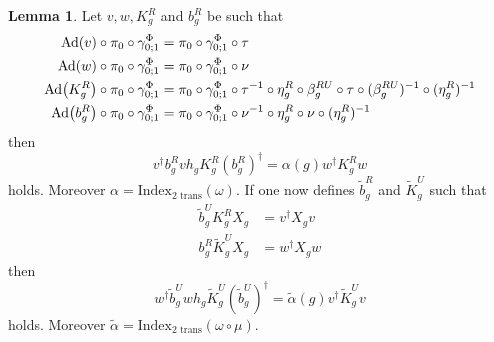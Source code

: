 \documentclass[12pt,a4paper,twoside]{article}
\let\originalleft\left
\let\originalright\right
\renewcommand{\left}{\mathopen{}\mathclose\bgroup\originalleft}
\renewcommand{\right}{\aftergroup\egroup\originalright}
\newcommand{\Ad}[1]{\textrm{Ad}\left(#1\right)}
\theoremstyle{definition}
\newtheorem{lemma}[theorem]{Lemma}
\numberwithin{equation}{section}
\begin{document}
\begin{lemma}
	Let $v,w,K_g^R$ and $b_g^R$ be such that
	\begin{align}
		\Ad{v}\circ\pi_0\circ\gamma^\Phi_{0;1}&=\pi_0\circ\gamma^\Phi_{0;1}\circ\tau\\
		\Ad{w}\circ\pi_0\circ\gamma^\Phi_{0;1}&=\pi_0\circ\gamma^\Phi_{0;1}\circ\nu\\
		\Ad{K_g^R}\circ\pi_0\circ\gamma^\Phi_{0;1}&=\pi_0\circ\gamma^\Phi_{0;1}\circ\tau^{-1}\circ\eta_g^R\circ\beta_g^{RU}\circ\tau\circ(\beta_g^{RU})^{-1}\circ(\eta_g^R)^{-1}\\
		\Ad{b_g^R}\circ\pi_0\circ\gamma^\Phi_{0;1}&=\pi_0\circ\gamma^\Phi_{0;1}\circ\nu^{-1}\circ\eta_g^R\circ\nu\circ(\eta_g^R)^{-1}
	\end{align}
	then
	\begin{equation}\label{eq:H^1IndexRotationInvariantHorizontalIndex}
		v^\dagger b_g^R vh_g K_g^R (b_g^R)^\dagger=\alpha(g)w^\dagger K_g^R w
	\end{equation}
	holds. Moreover $\alpha=\textrm{Index}_{\text{2 trans}}(\omega)$. If one now defines $\tilde{b}_g^R$ and $\tilde{K}_g^U$ such that
	\begin{align}
		\label{eq:H^1IndexRotationInvariantFirstDefinition}
		\tilde{b}_g^UK_g^R X_g&=v^\dagger X_g v\\
		\label{eq:H^1IndexRotationInvariantSecondDefinition}
		b_g^R\tilde{K}_g^UX_g&=w^\dagger X_g w
	\end{align}
	then
	\begin{equation}\label{eq:H^1IndexRotationInvariantVerticalIndex}
		w^\dagger \tilde b_g^U wh_g \tilde K_g^U (\tilde b_g^U)^\dagger=\tilde\alpha(g)v^\dagger \tilde K_g^U v
	\end{equation}
	holds. Moreover $\tilde\alpha=\textrm{Index}_{\text{2 trans}}(\omega\circ\mu)$.
\end{lemma}
\end{document}
